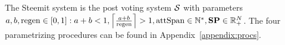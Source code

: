 \begin{definition}
  The Steemit system is the post voting system $\pvs$ with parameters $a, b,
  \regen \in \left[0, 1\right]: a + b < 1, \ceil*{\frac{a + b}{\regen}} > 1,
  \attspan \in \mathbb{N}^*, \stpowvec \in \mathbb{R}_{+}^\playerlen$. The four
  parametrizing procedures can be found in Appendix~\ref{appendix:procs}.
\end{definition}
